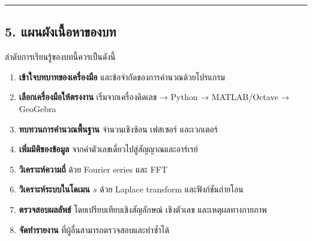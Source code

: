 \par\noindent\rule{\textwidth}{0.4pt}\par

\subsection{5. แผนผังเนื้อหาของบท}

ลำดับการเรียนรู้ของบทนี้ควรเป็นดังนี้

\begin{enumerate}
    \item \textbf{เข้าใจบทบาทของเครื่องมือ} และข้อจำกัดของการคำนวณด้วยโปรแกรม
    \item \textbf{เลือกเครื่องมือให้ตรงงาน} เริ่มจากเครื่องคิดเลข → Python → MATLAB/Octave → GeoGebra
    \item \textbf{ทบทวนการคำนวณพื้นฐาน} จำนวนเชิงซ้อน เฟสเซอร์ และเวกเตอร์
    \item \textbf{เพิ่มมิติของข้อมูล} จากค่าตัวเลขเดี่ยวไปสู่สัญญาณและอาร์เรย์
    \item \textbf{วิเคราะห์ความถี่} ด้วย Fourier series และ FFT
    \item \textbf{วิเคราะห์ระบบในโดเมน $s$} ด้วย Laplace transform และฟังก์ชันถ่ายโอน
    \item \textbf{ตรวจสอบผลลัพธ์} โดยเปรียบเทียบเชิงสัญลักษณ์ เชิงตัวเลข และเหตุผลทางกายภาพ
    \item \textbf{จัดทำรายงาน} ที่ผู้อื่นสามารถตรวจสอบและทำซ้ำได้
\end{enumerate}


